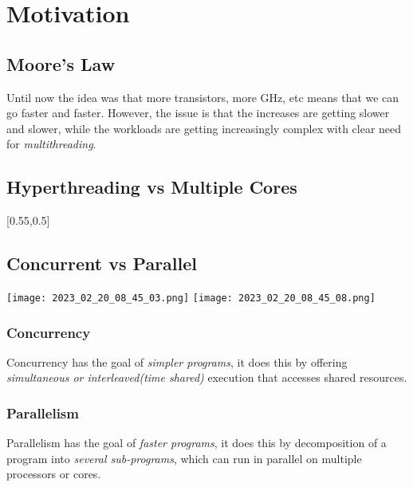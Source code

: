\documentclass[main.tex,fontsize=8pt,paper=a4,paper=portrait,DIV=calc,]{scrartcl}
\begin{document}
\tableofcontents

\lstset{
    language=Java,
    style=code,
}

\newcommand{\TITLE}{Parallel Programming}
\newcommand{\AUTHOR}{Fabio Lenherr}
\setcounter{tocdepth}{1}

\section{Motivation}

\subsection{Moore's Law}
Until now the idea was that more transistors, more GHz, etc means that we can go faster and faster.
However, the issue is that the increases are getting slower and slower, while the workloads are getting increasingly complex with clear need for \emph{multithreading}.

\subsection{Hyperthreading vs Multiple Cores}
[0.55,0.5]

\subsection{Concurrent vs Parallel}
\texttt{[image: 2023\_02\_20\_08\_45\_03.png]}
\texttt{[image: 2023\_02\_20\_08\_45\_08.png]}

\subsubsection{Concurrency}
Concurrency has the goal of \emph{simpler programs}, it does this by offering \emph{simultaneous or interleaved(time shared)} execution that accesses shared resources. 

\subsubsection{Parallelism}
Parallelism has the goal of \emph{faster programs}, it does this by decomposition of a program into \emph{several sub-programs}, which can run in parallel on multiple processors or cores.
\end{document}
